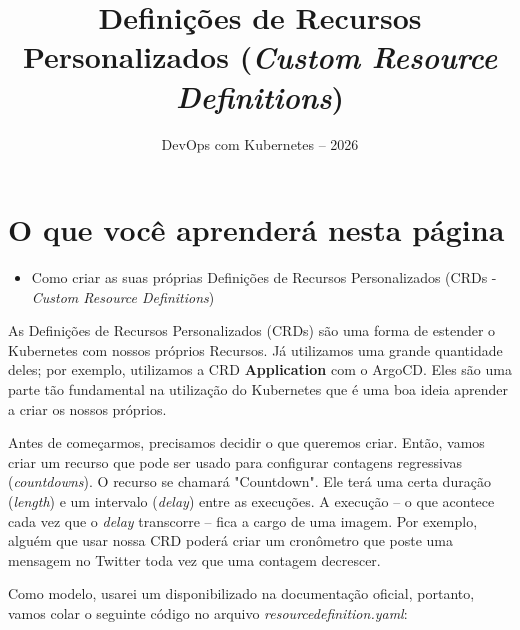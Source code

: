 \documentclass[11pt,a4paper]{article}
\title{\color{secondary}\Huge\textbf{Definições de Recursos Personalizados (\textit{Custom Resource Definitions})}}
\author{\color{primary}DevOps com Kubernetes -- 2026}
\date{}
\begin{document}
\maketitle

\section*{\color{primary}O que você aprenderá nesta página}
\begin{itemize}
    \item Como criar as suas próprias Definições de Recursos Personalizados (CRDs - \textit{Custom Resource Definitions})
\end{itemize}

As Definições de Recursos Personalizados (CRDs) são uma forma de estender o Kubernetes com nossos próprios Recursos. Já utilizamos uma grande quantidade deles; por exemplo, utilizamos a CRD \textbf{Application} com o ArgoCD. Eles são uma parte tão fundamental na utilização do Kubernetes que é uma boa ideia aprender a criar os nossos próprios.

Antes de começarmos, precisamos decidir o que queremos criar. Então, vamos criar um recurso que pode ser usado para configurar contagens regressivas (\textit{countdowns}). O recurso se chamará "Countdown". Ele terá uma certa duração (\textit{length}) e um intervalo (\textit{delay}) entre as execuções. A execução – o que acontece cada vez que o \textit{delay} transcorre – fica a cargo de uma imagem. Por exemplo, alguém que usar nossa CRD poderá criar um cronômetro que poste uma mensagem no Twitter toda vez que uma contagem decrescer.

Como modelo, usarei um disponibilizado na documentação oficial, portanto, vamos colar o seguinte código no arquivo \textit{resourcedefinition.yaml}:
\end{document}
